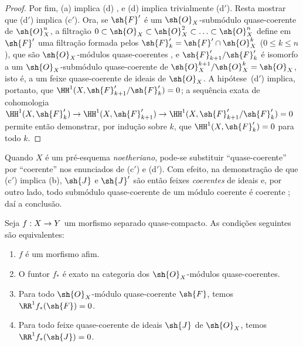 \documentclass[oneside,10pt]{amsart}
\makeatletter
\renewcommand{\leq}{\leqslant}
\newcommand{\ega@arrow}[2]{\mathchoice{#1}{#2}{#2}{#2}}
\renewcommand{\to}{\ega@arrow{\longrightarrow}{\rightarrow}}
\let\EGAOriginalLabel\label
\renewcommand{\label}[1]{\phantomsection\EGAOriginalLabel{#1}}
\makeatother
\begin{document}
\begin{proof}
Por fim, (a) implica (d) , e (d) implica trivialmente (d$'$).
Resta mostrar que (d$'$) implica (c$'$).
Ora, se $\sh{F}'$ é um $\sh{O}_X$-submódulo quase-coerente de $\sh{O}_X^n$, a filtração $0\subset\sh{O}_X\subset\sh{O}_X^2\subset\ldots\subset\sh{O}_X^n$ define em $\sh{F}'$ uma filtração formada pelos $\sh{F}'_k=\sh{F}'\cap\sh{O}_X^k$ ($0\leq k\leq n$), que são $\sh{O}_X$-módulos quase-coerentes , e $\sh{F}'_{k+1}/\sh{F}'_k$ é isomorfo a um $\sh{O}_X$-submódulo quase-coerente de $\sh{O}_X^{k+1}/\sh{O}_X^k=\sh{O}_X$, isto é, a um feixe quase-coerente de ideais de $\sh{O}_X$.
A hipótese~(d$'$) implica, portanto, que $\HH^1(X,\sh{F}'_{k+1}/\sh{F}'_k)=0$;
a sequência exata de cohomologia $\HH^1(X,\sh{F}'_k)\to\HH^1(X,\sh{F}'_{k+1})\to\HH^1(X,\sh{F}'_{k+1}/\sh{F}'_k)=0$ permite então demonstrar, por indução sobre $k$, que $\HH^1(X,\sh{F}'_k)=0$ para todo $k$.
\end{proof}

\begin{remark}[5.2.1.1]
\label{II.5.2.1.1}
Quando $X$ é um pré-esquema \emph{noetheriano}, pode-se substituir ``quase-coerente'' por ``coerente'' nos enunciados de (c$'$) e (d$'$).
Com efeito, na demonstração de que (c$'$) implica (b), $\sh{J}$ e $\sh{J}'$ são então feixes \emph{coerentes} de ideais e, por outro lado, todo submódulo quase-coerente de um módulo coerente é coerente ;
daí a conclusão.
\end{remark}

\begin{corollary}[5.2.2]
\label{II.5.2.2}
Seja $f:X\to Y$ um morfismo separado quase-compacto.
As condições seguintes são equivalentes:
\begin{enumerate}
  \item[{\rm(a)}] $f$ é um morfismo afim.
  \item[{\rm(b)}] O funtor $f_*$ é exato na categoria dos $\sh{O}_X$-módulos quase-coerentes.
  \item[{\rm(c)}] Para todo $\sh{O}_X$-módulo quase-coerente $\sh{F}$, temos $\RR^1f_*(\sh{F})=0$.
  \item[{\rm(c')}] Para todo feixe quase-coerente de ideais $\sh{J}$ de $\sh{O}_X$, temos $\RR^1f_*(\sh{J})=0$.
\end{enumerate}
\end{corollary}
\end{document}
